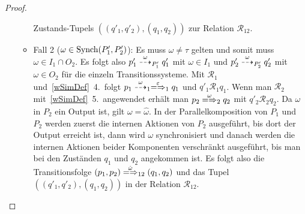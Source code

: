 \begin{proof}
\begin{enumerate}
\begin{itemize}
          Zustands-Tupels $((q'_1,q'_2),(q_1,q_2))$ zur Relation
          $\mathcal{R}_{12}$.
        \item Fall 2 ($\omega\in\mathrm{Synch} (P'_1,P'_2)$): Es muss $\omega\neq\tau$
          gelten und somit muss \oBdA{} $\omega\in I_1\cap O_2$. Es folgt also
          $p'_1\may[\omega]_{P'_1} q'_1$ mit $\omega\in I_1$ und $p'_2
          \may[\omega]_{P'_2} q'_2$ mit $\omega\in O_2$ für die einzeln
          Transitionssysteme. Mit $\mathcal{R}_1$ und~\ref{wSimDef}~4.\ folgt
          $p_1\may[\omega]_1 \weakmay[\varepsilon]_1 q_1$ und $q'_1
          \mathcal{R}_1 q_1$. Wenn man $\mathcal{R}_2$ mit~\ref{wSimDef}~5.\
          angewendet erhält man $p_2 \weakmay[\omega]_2 q_2$ mit
          $q'_2\mathcal{R}_2 q_2$. Da $\omega$ in $P_2$ ein Output ist, gilt
          $\omega =\hat{\omega}$. In der Parallelkomposition von $P_1$ und
          $P_2$ werden zuerst die internen Aktionen von $P_2$ ausgeführt, bis
          dort der Output erreicht ist, dann wird $\omega$ synchronisiert und
          danach werden die internen Aktionen beider Komponenten verschränkt
          ausgeführt, bis man bei den Zuständen $q_1$ und $q_2$ angekommen ist.
          Es folgt also die Transitionsfolge $(p_1,p_2)
          \weakmay[\hat{\omega}]_{12} (q_1,q_2)$ und das Tupel
          $((q'_1,q'_2),(q_1,q_2))$ in der Relation $\mathcal{R}_{12}$.
      \end{itemize}
  \end{enumerate}
\end{proof}

